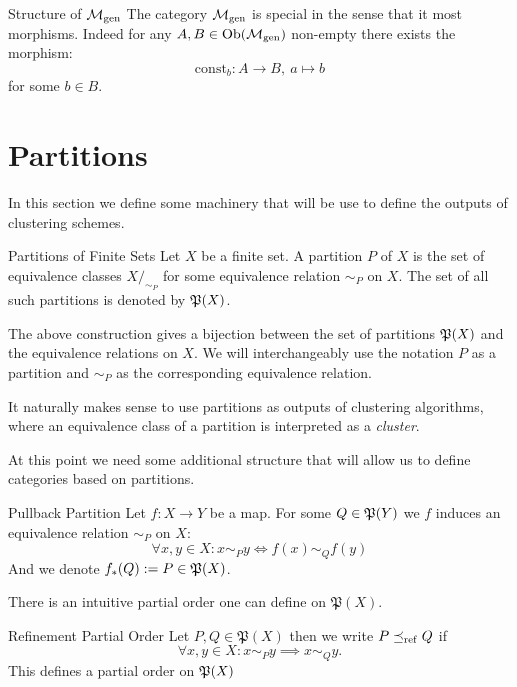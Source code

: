 \begin{myremark}{Structure of $\gen$}{}
The category $\gen$ is special in the sense that it most morphisms. Indeed for any $A,B \in \ob(\gen)$ non-empty there exists the morphism:
$$
\mathrm{const}_b: A \to B, \ a \mapsto b
$$
for some $b \in B$.
\end{myremark}


\section{Partitions}
\label{section__partitions}
In this section we define some machinery that will be use to define the outputs of clustering schemes.

\begin{definition}{Partitions of Finite Sets}{}
Let $X$ be a finite set. A partition $P$ of $X$ is the set of equivalence classes $X/_{\sim_P}$ for some equivalence relation $\sim_P$ on $X$.
The set of all such partitions is denoted by $\P(X)$.
\end{definition}

\begin{myremark}{}{}
The above construction gives a bijection between the set of partitions $\P(X)$ and the equivalence relations on $X$. We will interchangeably use the notation $P$ as a partition and $\sim_P$ as the corresponding equivalence relation.
\end{myremark}

It naturally makes sense to use partitions as outputs of clustering algorithms, where an equivalence class of a partition is interpreted as a \emph{cluster}.

At this point we need some additional structure that will allow us to define categories based on partitions.

\begin{definition}{Pullback Partition}{}
Let $f: X \to Y$ be a map. For some $Q \in \P(Y)$ we $f$ induces an equivalence relation $\sim_P$ on $X$:
\begin{equation*}
\forall x,y \in X: x \sim_P y \iff f(x) \sim_Q f(y)
\end{equation*}
And we denote $f_*(Q) := P \in \P(X)$.
\end{definition}

There is an intuitive partial order one can define on $\mathfrak{P}(X)$.
\begin{definition}
{Refinement Partial Order}{}
Let $P, Q \in \mathfrak{P}(X)$ then we write $P \refines Q$ if
\begin{equation*}
    \forall x,y \in X: x \sim_P y \implies x \sim_Q y.
\end{equation*}
This defines a partial order on $\P(X)$
\end{definition}

